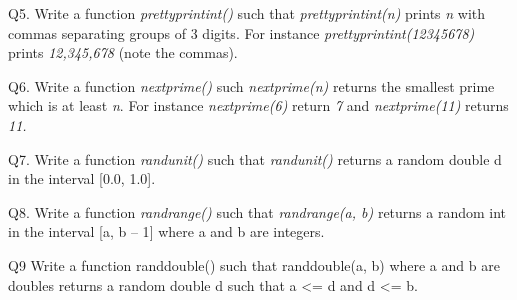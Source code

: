 \documentclass[
]{article}
\begin{document}
Q5. Write a function \emph{prettyprintint()} such that
\emph{prettyprintint(n)} prints \emph{n} with commas separating groups
of 3 digits. For instance \emph{prettyprintint(12345678)} prints
\emph{12,345,678} (note the commas).

Q6. Write a function \emph{nextprime()} such \emph{nextprime(n)} returns
the smallest prime which is at least \emph{n}. For instance
\emph{nextprime(6)} return \emph{7 }and \emph{nextprime(11)} returns
\emph{11.}

Q7. Write a function \emph{randunit()} such that \emph{randunit()}
returns a random double d in the interval {[}0.0, 1.0{]}.

Q8. Write a function \emph{randrange()} such that \emph{randrange(a, b)}
returns a random int in the interval {[}a, b -- 1{]} where a and b are
integers.

Q9 Write a function randdouble() such that randdouble(a, b) where a and
b are doubles returns a random double d such that a \textless= d and d
\textless= b.
\end{document}
